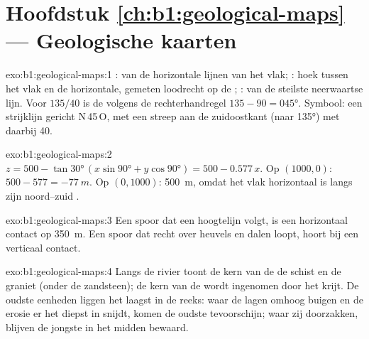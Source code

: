 \section*{Hoofdstuk \ref{ch:b1:geological-maps} --- Geologische kaarten}

\begin{solution}{exo:b1:geological-maps:1}
:  van de horizontale lijnen van het vlak; : hoek tussen het vlak en de
horizontale, gemeten loodrecht op de ; :  van de steilste neerwaartse
lijn. Voor $135/40$ is de  volgens de rechterhandregel $135 - 90 = \ang{045}$. Symbool: een
strijklijn gericht N\,45\,O, met een streep aan de zuidoostkant (naar \ang{135}) met daarbij 40.
\end{solution}

\begin{solution}{exo:b1:geological-maps:2}
$z = 500 - \tan\ang{30}\,(x\sin\ang{90} + y\cos\ang{90}) = 500 - 0.577\,x$.
Op $(1000, 0)$: $500 - 577 = \qty{-77}{m}$. Op $(0, 1000)$: \qty{500}{m}, omdat het vlak
horizontaal is langs zijn noord--zuid .
\end{solution}

\begin{solution}{exo:b1:geological-maps:3}
Een spoor dat een hoogtelijn volgt, is een horizontaal contact op \qty{350}{m}. Een spoor dat recht
over heuvels en dalen loopt, hoort bij een verticaal contact.
\end{solution}

\begin{solution}{exo:b1:geological-maps:4}
Langs de rivier toont de kern van de  de schist en de graniet (onder de zandsteen); de
kern van de  wordt ingenomen door het krijt. De oudste eenheden liggen het laagst in de
reeks: waar de lagen omhoog buigen en de erosie er het diepst in snijdt, komen de oudste tevoorschijn;
waar zij doorzakken, blijven de jongste in het midden bewaard.
\end{solution}

